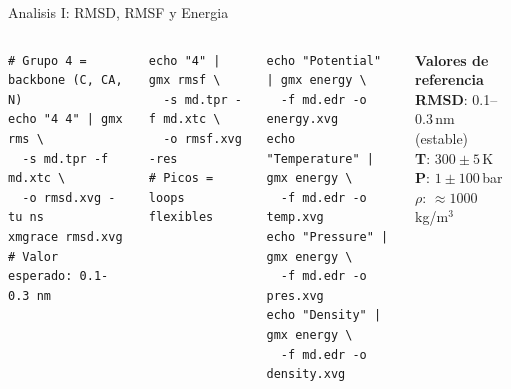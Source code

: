 \documentclass[aspectratio=169, 10pt]{beamer}
\begin{document}
\begin{frame}[fragile]{Analisis I: RMSD, RMSF y Energia}
\begin{columns}[T]
\begin{tcolorbox}[definitionbox, title={RMSD del backbone}]
\begin{lstlisting}[style=bashstyle]
# Grupo 4 = backbone (C, CA, N)
echo "4 4" | gmx rms \
  -s md.tpr -f md.xtc \
  -o rmsd.xvg -tu ns
xmgrace rmsd.xvg
# Valor esperado: 0.1-0.3 nm
\end{lstlisting}
\end{tcolorbox}
\begin{tcolorbox}[definitionbox, title={RMSF por residuo}]
\begin{lstlisting}[style=bashstyle]
echo "4" | gmx rmsf \
  -s md.tpr -f md.xtc \
  -o rmsf.xvg -res
# Picos = loops flexibles
\end{lstlisting}
\end{tcolorbox}
\begin{tcolorbox}[definitionbox, title={Energia, temperatura, presion}]
\begin{lstlisting}[style=bashstyle]
echo "Potential" | gmx energy \
  -f md.edr -o energy.xvg
echo "Temperature" | gmx energy \
  -f md.edr -o temp.xvg
echo "Pressure" | gmx energy \
  -f md.edr -o pres.xvg
echo "Density" | gmx energy \
  -f md.edr -o density.xvg
\end{lstlisting}
\end{tcolorbox}
\begin{tcolorbox}[comparisonbox]
\small
\textbf{Valores de referencia}\\
\textbf{RMSD}: 0.1--0.3\,nm (estable)\\
\textbf{T}: $300 \pm 5$\,K\\
\textbf{P}: $1 \pm 100$\,bar\\
\textbf{$\rho$}: $\approx 1000$\,kg/m$^3$
\end{tcolorbox}
\end{columns}
\end{frame}
\end{document}
